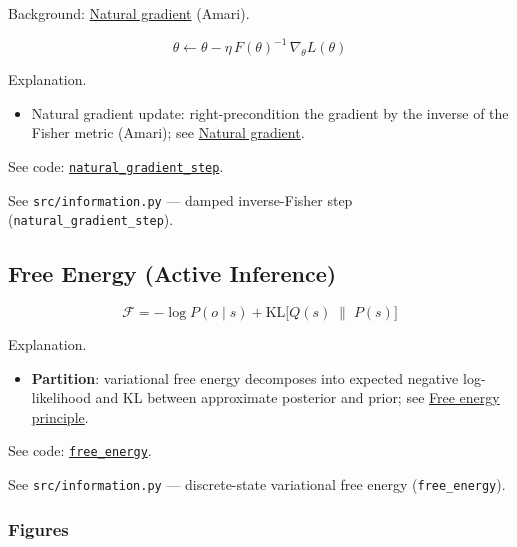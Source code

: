 \documentclass[
  10pt,
]{article}
\providecommand{\tightlist}{%
  \setlength{\itemsep}{0pt}\setlength{\parskip}{0pt}}
\begin{document}
Background:
\href{https://en.wikipedia.org/wiki/Natural_gradient}{Natural gradient}
(Amari).

\begin{equation}\label{eq:supp_natgrad}
\theta \leftarrow \theta - \eta\, F(\theta)^{-1}\, \nabla_{\theta} L(\theta)
\end{equation}

Explanation.

\begin{itemize}
\tightlist
\item
  Natural gradient update: right-precondition the gradient by the
  inverse of the Fisher metric (Amari); see
  \href{https://en.wikipedia.org/wiki/Natural_gradient}{Natural
  gradient}.
\end{itemize}

See code:
\href{03_quadray_methods.md\#code:natural_gradient_step}{\texttt{natural\_gradient\_step}}.

See \texttt{src/information.py} --- damped inverse-Fisher step
(\texttt{natural\_gradient\_step}).

\hypertarget{eq:free_energy}{%
\subsection{Free Energy (Active Inference)}\label{eq:free_energy}}

\begin{equation}\label{eq:supp_free_energy}
\mathcal{F} = -\log P(o\mid s) + \mathrm{KL}\big[ Q(s)\;\|\; P(s) \big]
\end{equation}

Explanation.

\begin{itemize}
\tightlist
\item
  \textbf{Partition}: variational free energy decomposes into expected
  negative log-likelihood and KL between approximate posterior and
  prior; see
  \href{https://en.wikipedia.org/wiki/Free_energy_principle}{Free energy
  principle}.
\end{itemize}

See code:
\href{03_quadray_methods.md\#code:free_energy}{\texttt{free\_energy}}.

See \texttt{src/information.py} --- discrete-state variational free
energy (\texttt{free\_energy}).

\hypertarget{figures-2}{%
\subsubsection{Figures}\label{figures-2}}
\end{document}
